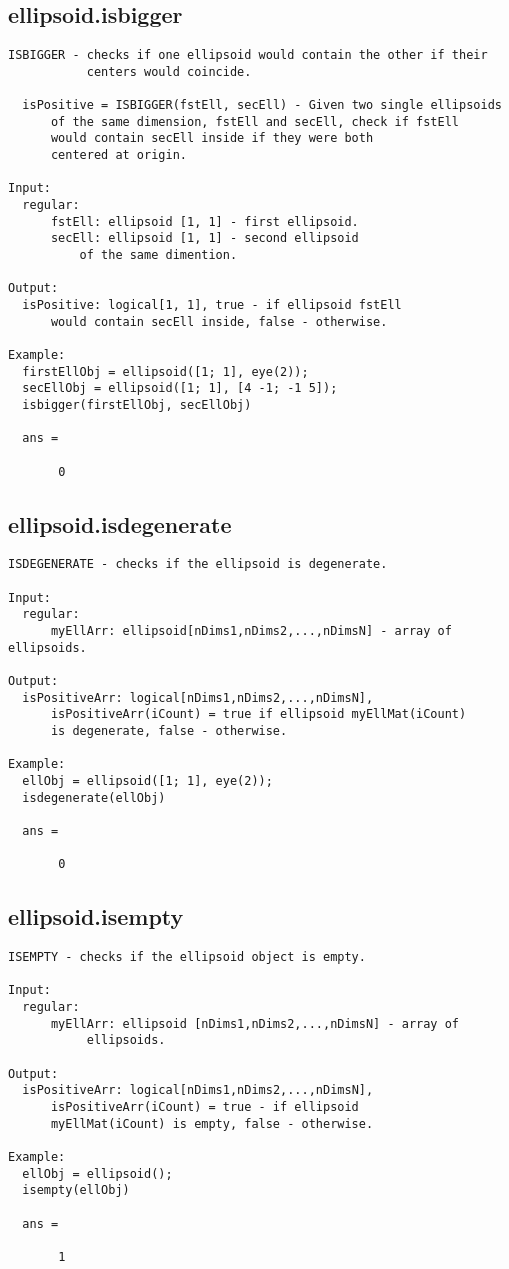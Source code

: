\subsection{\texorpdfstring{ellipsoid.isbigger}{isbigger}}\label{method:ellipsoid.isbigger}
\begin{verbatim}
ISBIGGER - checks if one ellipsoid would contain the other if their
           centers would coincide.

  isPositive = ISBIGGER(fstEll, secEll) - Given two single ellipsoids
      of the same dimension, fstEll and secEll, check if fstEll
      would contain secEll inside if they were both
      centered at origin.

Input:
  regular:
      fstEll: ellipsoid [1, 1] - first ellipsoid.
      secEll: ellipsoid [1, 1] - second ellipsoid
          of the same dimention.

Output:
  isPositive: logical[1, 1], true - if ellipsoid fstEll
      would contain secEll inside, false - otherwise.

Example:
  firstEllObj = ellipsoid([1; 1], eye(2));
  secEllObj = ellipsoid([1; 1], [4 -1; -1 5]);
  isbigger(firstEllObj, secEllObj)

  ans =

       0
\end{verbatim}
\subsection{\texorpdfstring{ellipsoid.isdegenerate}{isdegenerate}}\label{method:ellipsoid.isdegenerate}
\begin{verbatim}
ISDEGENERATE - checks if the ellipsoid is degenerate.

Input:
  regular:
      myEllArr: ellipsoid[nDims1,nDims2,...,nDimsN] - array of ellipsoids.

Output:
  isPositiveArr: logical[nDims1,nDims2,...,nDimsN],
      isPositiveArr(iCount) = true if ellipsoid myEllMat(iCount)
      is degenerate, false - otherwise.

Example:
  ellObj = ellipsoid([1; 1], eye(2));
  isdegenerate(ellObj)

  ans =

       0
\end{verbatim}
\subsection{\texorpdfstring{ellipsoid.isempty}{isempty}}\label{method:ellipsoid.isempty}
\begin{verbatim}
ISEMPTY - checks if the ellipsoid object is empty.

Input:
  regular:
      myEllArr: ellipsoid [nDims1,nDims2,...,nDimsN] - array of
           ellipsoids.

Output:
  isPositiveArr: logical[nDims1,nDims2,...,nDimsN],
      isPositiveArr(iCount) = true - if ellipsoid
      myEllMat(iCount) is empty, false - otherwise.

Example:
  ellObj = ellipsoid();
  isempty(ellObj)

  ans =

       1
\end{verbatim}
